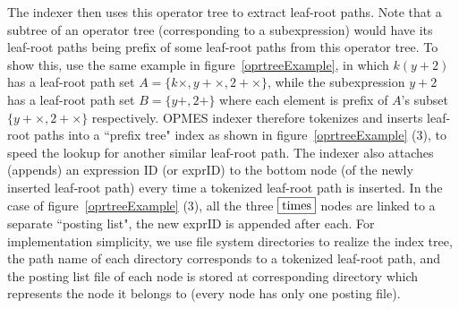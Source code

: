 \documentclass{llncs}
\begin{document}
The indexer then uses this operator tree to extract leaf-root paths.
Note that a subtree of an operator tree (corresponding to a subexpression) would have its leaf-root paths being prefix of some leaf-root paths from this operator tree. 
To show this, use the same example in figure~\ref{oprtreeExample}, in which $k(y + 2)$ has a leaf-root path set $A = \{ k \times, y + \times, 2 + \times \}$, while the subexpression $y + 2$ has a leaf-root path set $B = \{ y +, 2 +\}$ where each element is prefix of $A$'s subset $\{y + \times, 2 + \times \}$ respectively.
OPMES indexer therefore tokenizes and inserts leaf-root paths into a ``prefix tree" index as shown in figure~\ref{oprtreeExample} (3), to speed the lookup for another similar leaf-root path.
The indexer also attaches (appends) an expression ID (or exprID) to the bottom node (of the newly inserted leaf-root path) every time a tokenized leaf-root path is inserted. In the case of figure~\ref{oprtreeExample} (3), all the three $\fbox{times}$ nodes are linked to a separate ``posting list", the new exprID is appended after each.
For implementation simplicity, we use file system directories to realize the index tree, the path name of each directory corresponds to a tokenized leaf-root path, and the posting list file of each node is stored at corresponding directory which represents the node it belongs to (every node has only one posting file).
\end{document}
